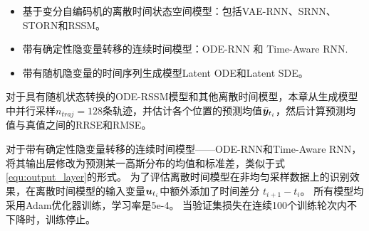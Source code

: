 \begin{itemize}
    \item 基于变分自编码机的离散时间状态空间模型：包括VAE-RNN、SRNN、STORN和RSSM。
    \item 带有确定性隐变量转移的连续时间模型：ODE-RNN 和 Time-Aware RNN.
    \item 带有随机隐变量的时间序列生成模型Latent ODE和Latent SDE。
\end{itemize}

对于具有随机状态转换的ODE-RSSM模型和其他离散时间模型，本章从生成模型中并行采样$n_{traj}=128$条轨迹，并估计各个位置的预测均值$\bar{\boldsymbol{y}}_{t_i}$，然后计算预测均值与真值之间的RRSE和RMSE。

对于带有确定性隐变量转移的连续时间模型——ODE-RNN和Time-Aware RNN，将其输出层修改为预测某一高斯分布的均值和标准差，类似于式\eqref{equ:output_layer}的形式。
为了评估离散时间模型在非均匀采样数据上的识别效果，在离散时间模型的输入变量$\boldsymbol{u}_{t_i}$中额外添加了时间差分 $t_{i+1}-t_i$。
所有模型均采用Adam优化器训练，学习率是5e-4。
当验证集损失在连续100个训练轮次内不下降时，训练停止。

